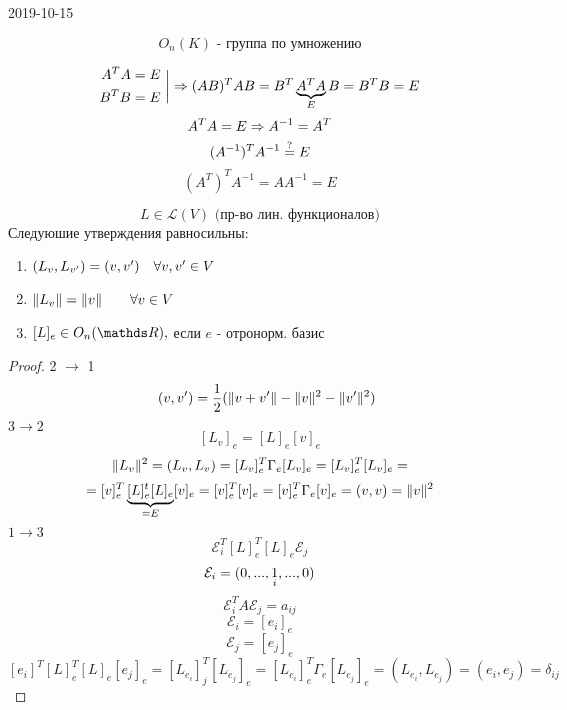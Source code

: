 \documentclass[main]{subfiles}
\begin{document}
\begin{lect} {2019-10-15}
		\begin{Utv}
			\[O_n(K) \text{ - группа по умножению}\]
		\end{Utv}

		\begin{Proof}
		    \[\begin{align}
		    		A^T A = E\\
					B^T B = E
				\end{align} \  \bigg| \Rightarrow (AB)^T AB = B^T \underbrace{A^TA}_E B = B^T B = E\]
				\[A^T A = E \Rightarrow A^{-1} = A^T \]
				\[(A^{-1})^T A^{-1} \overset{?}{=} E \]
				\[(A^T)^T A^{-1}  = AA^{-1}  = E\]
		\end{Proof}

		\begin{Utv}
			\[L \in \mathscr{L}(V) \text{ (пр-во лин. функционалов)}\]
			Следуюшие утверждения равносильны:
			\begin{enumerate}
				\item $(L_v, L_{v'}) = (v, v') \quad \forall v, v' \in V$
				\item $\lVert L_v \rVert = \lVert v \rVert \quad\quad \forall v \in V$
				\item $[L]_e \in O_n(\R), $ если $e$ - отронорм. базис
			\end{enumerate}
		\end{Utv}

		\begin{proof}
			2 $\to$ 1
			\[\quad(v, v') = \frac{1}{2}(\lVert v + v' \rVert - \lVert v \rVert^2 - \lVert v' \rVert^2)\]
			$3 \to 2$
			\[[L_v]_e = [L]_e [v]_e\]
			\[\lVert L_v \rVert^2 = (L_v, L_v) = [L_v]^T_e \Gamma_e [L_v]_e = [L_v]^T_e [L_v]_e = \]
			\[= [v]_e^T \underbrace{[L]_e^t [L]_e}_{= E} [v]_e  = [v]^T_e [v]_e =
			[v]^T_e \Gamma_e [v]_e = (v, v) = \lVert v \rVert^2\]
			$1 \to 3$
			\[\mathcal{E}_i^T [L]_e^T [L]_e \mathcal{E}_j\]
			\[\mathcal{E}_i = (0, ..., \underset{i}{1}, ..., 0)\]
			\[\mathcal{E}_i^T A \mathcal{E}_j = a_{ij} \]
			\[\mathcal{E}_i = [e_i]_e\]
			\[\mathcal{E}_j = [e_j]_e\]
			\[[e_i]^T [L]_e^T [L]_e [e_j]_e = [L_{e_i}]_j^T [L_{e_j}]_e = [L_{e_i}]_e^T \Gamma_e
			[L_{e_j}]_e = (L_{e_i}, L_{e_j}) = (e_i, e_j) = \delta_{ij} \]
		\end{proof}
	\end{lect}
\end{document}
